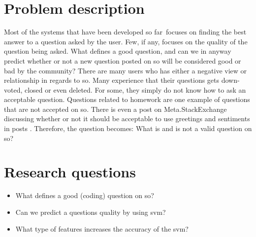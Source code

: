 \section{Problem description}
\label{sec:problem_description}
Most of the systems that have been developed so far~focuses on finding the best answer to a question asked by the user. 
Few, if any, focuses on the quality of the question being asked. 
What defines a good question, and can we in anyway predict whether or not a new question posted on \gls{so} will be considered good or bad by the community?
There are many users who has either a negative view or relationship in regards to \gls{so}.
Many experience that their questions gets down-voted, closed or even deleted. 
For some, they simply do not know how to ask an acceptable question.
Questions related to homework are one example of questions that are not accepted on \gls{so}.
There is even a post on Meta.StackExchange discussing whether or not it should be acceptable to use greetings and sentiments in posts \cite{CommunityWiki2016a}.
Therefore, the question becomes: What is and is not a valid question on \gls{so}?

\section{Research questions}
\label{sec:research_questions}

\begin{itemize}
	\item What defines a good (coding) question on \gls{so}?
	\item Can we predict a questions quality by using \gls{svm}?
	\item What type of features increases the accuracy of the \gls{svm}?
\end{itemize}

